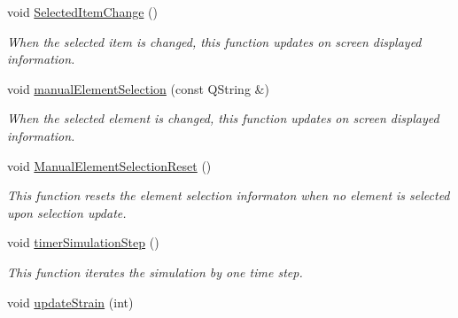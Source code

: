\begin{DoxyCompactItemize}
\item 
\hypertarget{classMainWindow_ab2c0d4d0d84826cc032a45ea4783dde5}{}void \hyperlink{classMainWindow_ab2c0d4d0d84826cc032a45ea4783dde5}{Selected\+Item\+Change} ()\label{classMainWindow_ab2c0d4d0d84826cc032a45ea4783dde5}

\begin{DoxyCompactList}\small\item\em When the selected item is changed, this function updates on screen displayed information. \end{DoxyCompactList}\item 
\hypertarget{classMainWindow_af6253ec8c287b675a80e80bdd0ad31cc}{}void \hyperlink{classMainWindow_af6253ec8c287b675a80e80bdd0ad31cc}{manual\+Element\+Selection} (const Q\+String \&)\label{classMainWindow_af6253ec8c287b675a80e80bdd0ad31cc}

\begin{DoxyCompactList}\small\item\em When the selected element is changed, this function updates on screen displayed information. \end{DoxyCompactList}\item 
\hypertarget{classMainWindow_ad613f2de4daee9c84828dc0490b00ffa}{}void \hyperlink{classMainWindow_ad613f2de4daee9c84828dc0490b00ffa}{Manual\+Element\+Selection\+Reset} ()\label{classMainWindow_ad613f2de4daee9c84828dc0490b00ffa}

\begin{DoxyCompactList}\small\item\em This function resets the element selection informaton when no element is selected upon selection update. \end{DoxyCompactList}\item 
void \hyperlink{classMainWindow_a59dd1f2fe0d6900a98feff45c94e23e6}{timer\+Simulation\+Step} ()
\begin{DoxyCompactList}\small\item\em This function iterates the simulation by one time step. \end{DoxyCompactList}\item 
\hypertarget{classMainWindow_a0dce0c101c73abe3b5f347cd4dacfbd3}{}void \hyperlink{classMainWindow_a0dce0c101c73abe3b5f347cd4dacfbd3}{update\+Strain} (int)\label{classMainWindow_a0dce0c101c73abe3b5f347cd4dacfbd3}


\end{DoxyCompactItemize}
